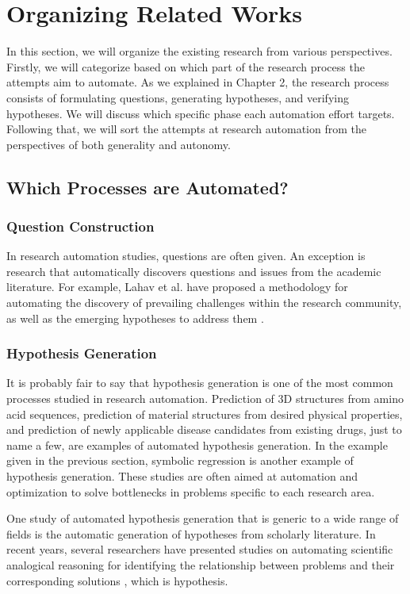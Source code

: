 \section{Organizing Related Works}
In this section, we will organize the existing research from various perspectives. Firstly, we will categorize based on which part of the research process the attempts aim to automate. As we explained in Chapter 2, the research process consists of formulating questions, generating hypotheses, and verifying hypotheses. We will discuss which specific phase each automation effort targets. Following that, we will sort the attempts at research automation from the perspectives of both generality and autonomy.

\subsection{Which Processes are Automated?}

\subsubsection{Question Construction}

In research automation studies, questions are often given. An exception is research that automatically discovers questions and issues from the academic literature. For example, Lahav et al. have proposed a methodology for automating the discovery of prevailing challenges within the research community, as well as the emerging hypotheses to address them \cite{lahav2022search}.

\subsubsection{Hypothesis Generation}
It is probably fair to say that hypothesis generation is one of the most common processes studied in research automation. Prediction of 3D structures from amino acid sequences, prediction of material structures from desired physical properties, and prediction of newly applicable disease candidates from existing drugs, just to name a few, are examples of automated hypothesis generation. In the example given in the previous section, symbolic regression is another example of hypothesis generation. These studies are often aimed at automation and optimization to solve bottlenecks in problems specific to each research area.

One study of automated hypothesis generation that is generic to a wide range of fields is the automatic generation of hypotheses from scholarly literature. In recent years, several researchers have presented studies on automating scientific analogical reasoning for identifying the relationship between problems and their corresponding solutions \cite{kang2022augmenting,chan2018solvent}, which is hypothesis.

